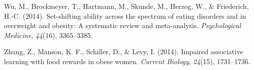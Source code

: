 \documentclass[
  man,floatsintext]{apa6}
\newlength{\cslhangindent}
\newlength{\cslentryspacingunit} %
\newenvironment{CSLReferences}[2] %
 {%
  \setlength{\parindent}{0pt}
  \ifodd #1
  \let\oldpar\par
  \def\par{\hangindent=\cslhangindent\oldpar}
  \fi
  \setlength{\parskip}{#2\cslentryspacingunit}
 }%
 {}
\begin{document}
\begin{CSLReferences}{1}{0}
\leavevmode{}%
Wu, M., Brockmeyer, T., Hartmann, M., Skunde, M., Herzog, W., \& Friederich, H.-C. (2014). Set-shifting ability across the spectrum of eating disorders and in overweight and obesity: A systematic review and meta-analysis. \emph{Psychological Medicine}, \emph{44}(16), 3365--3385.

\leavevmode{}%
Zhang, Z., Manson, K. F., Schiller, D., \& Levy, I. (2014). Impaired associative learning with food rewards in obese women. \emph{Current Biology}, \emph{24}(15), 1731--1736.

\end{CSLReferences}

\newpage

\begin{landscape}
   

\end{landscape}
\end{document}
